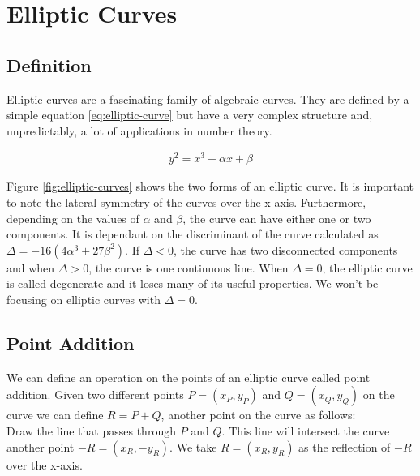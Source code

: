 \section{Elliptic Curves}

\subsection{Definition}

Elliptic curves are a fascinating family of algebraic curves. They are defined by a simple equation \eqref{eq:elliptic-curve} but have a very complex structure and, unpredictably, a lot of applications in number theory.

\begin{gather}
    y^2 = x^3 + \alpha x + \beta \label{eq:elliptic-curve}
\end{gather}


Figure \ref{fig:elliptic-curves} shows the two forms of an elliptic curve. It is important to note the lateral symmetry of the curves over the x-axis. Furthermore, depending on the values of $\alpha$ and $\beta$, the curve can have either one or two components. It is dependant on the discriminant of the curve calculated as $\Delta = -16(4\alpha^3 + 27\beta^2)$. If $\Delta < 0$, the curve has two disconnected components and when $\Delta > 0$, the curve is one continuous line. When $\Delta = 0$, the elliptic curve is called degenerate and it loses many of its useful properties. We won't be focusing on elliptic curves with $\Delta = 0$.

\subsection{Point Addition}

We can define an operation on the points of an elliptic curve called point addition. Given two different points $P = (x_P, y_P)$ and $Q = (x_Q, y_Q)$ on the curve we can define $R = P + Q$, another point on the curve as follows:
\\

Draw the line that passes through $P$ and $Q$. This line will intersect the curve another point $-R = (x_R, -y_R)$. We take $R = (x_R, y_R)$ as the reflection of $-R$ over the x-axis. 


